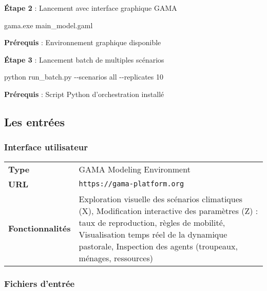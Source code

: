 \documentclass[
]{article}
\newenvironment{Shaded}{\begin{snugshade}}{\end{snugshade}}
\newcommand{\AttributeTok}[1]{\textcolor[rgb]{0.13,0.29,0.53}{#1}}
\newcommand{\ExtensionTok}[1]{#1}
\newcommand{\NormalTok}[1]{#1}
\begin{document}
\textbf{Étape 2} : Lancement avec interface graphique GAMA

\begin{Shaded}
\begin{Highlighting}[]
\ExtensionTok{gama.exe}\NormalTok{ main\_model.gaml}
\end{Highlighting}
\end{Shaded}

\textbf{Prérequis} : Environnement graphique disponible

\textbf{Étape 3} : Lancement batch de multiples scénarios

\begin{Shaded}
\begin{Highlighting}[]
\ExtensionTok{python}\NormalTok{ run\_batch.py }\AttributeTok{{-}{-}scenarios}\NormalTok{ all }\AttributeTok{{-}{-}replicates}\NormalTok{ 10}
\end{Highlighting}
\end{Shaded}

\textbf{Prérequis} : Script Python d'orchestration installé

\subsection{Les entrées}\label{les-entruxe9es}

\subsubsection{Interface utilisateur}\label{interface-utilisateur}

\begin{longtable}[]{@{}
  >{\raggedright\arraybackslash}p{}
  >{\raggedright\arraybackslash}p{}@{}}
\toprule\noalign{}
\endhead
\bottomrule\noalign{}
\endlastfoot
\textbf{Type} & GAMA Modeling Environment \\
\textbf{URL} & \texttt{https://gama-platform.org} \\
\textbf{Fonctionnalités} & Exploration visuelle des scénarios
climatiques (X), Modification interactive des paramètres (Z) : taux de
reproduction, règles de mobilité, Visualisation temps réel de la
dynamique pastorale, Inspection des agents (troupeaux, ménages,
ressources) \\
\end{longtable}

\subsubsection{Fichiers d'entrée}\label{fichiers-dentruxe9e}
\end{document}
